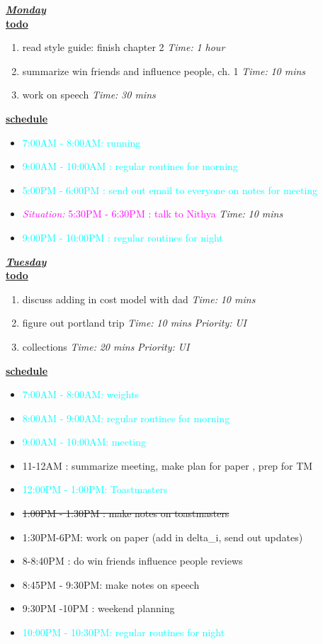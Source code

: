 \documentclass[11pt]{article}
\newcommand{\doneTask}[1]{\item \sout{#1}}
\newcommand{\timeEst}[1]{\textit{Time:} \textit{#1}}
\newcommand{\priority}[1]{\textit{Priority:} \textit{#1}}
\newcommand{\regItem}[1]{\item \textcolor{cyan}{#1}}
\newcommand{\situationItem}[1]{\item \textcolor{magenta}{\textit{Situation:} #1}}
\begin{document}
\underline{\textbf{\textit{Monday}}}\\
\underline{\textbf{todo}}\\
\begin{enumerate}
\item read style guide:  finish chapter 2  \timeEst{1 hour}
\item summarize win friends and influence people, ch. 1 \timeEst{10 mins}
\item work on speech \timeEst{30 mins}
\end{enumerate}

\underline{\textbf{schedule}}\\
\begin{itemize}
\regItem{7:00AM - 8:00AM: running}
\regItem{9:00AM - 10:00AM : regular routines for morning}
\regItem{5:00PM - 6:00PM : send out email to everyone on notes for meeting}
\situationItem{ 5:30PM - 6:30PM : talk to Nithya} \timeEst{10 mins}
\regItem{9:00PM - 10:00PM : regular routines for night}
\end{itemize}

\underline{\textbf{\textit{Tuesday}}}\\
\underline{\textbf{todo}}\\
\begin{enumerate}
\item discuss adding in cost model with dad \timeEst{10 mins}
\item figure out portland trip \timeEst{10 mins} \priority{UI}
\item collections \timeEst{20 mins} \priority{UI}
\end{enumerate}

\underline{\textbf{schedule}}\\
\begin{itemize}
\regItem{7:00AM - 8:00AM: weights}
\regItem {8:00AM - 9:00AM: regular routines for morning}
\regItem {9:00AM - 10:00AM: meeting}
\item 11-12AM  :  summarize meeting, make plan for paper , prep for TM
\regItem {12:00PM - 1:00PM: Toastmasters}
\doneTask{ 1:00PM - 1:30PM : make notes on toastmasters}
\item 1:30PM-6PM:  work on paper (add in delta_i,  send  out updates)
\item 8-8:40PM :  do win friends influence people reviews
\item 8:45PM - 9:30PM: make notes on speech
\item 9:30PM -10PM : weekend planning
\regItem {10:00PM - 10:30PM: regular routines for night}
\end{itemize}
\end{document}
